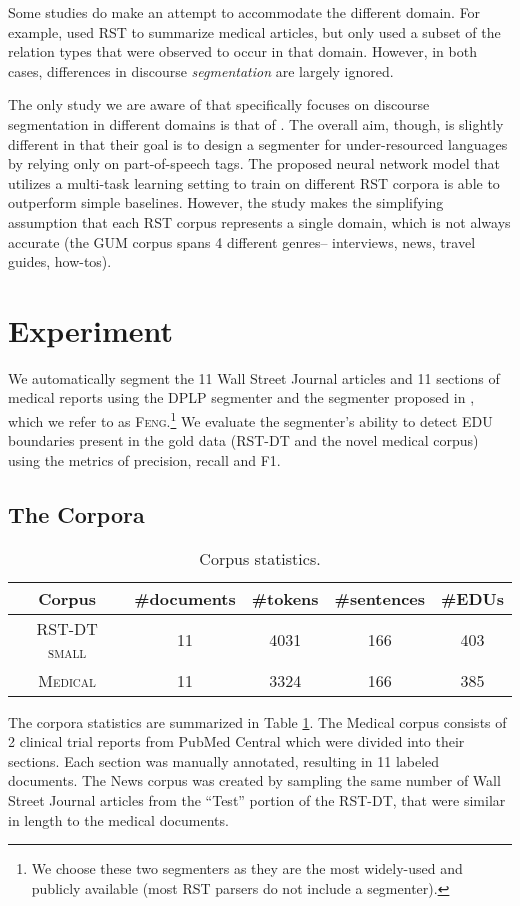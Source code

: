 Some studies do make an attempt to accommodate the different domain. For example,  used RST to summarize medical articles, but only used a subset of the relation types that were observed to occur in that domain. However, in both cases, differences in discourse \emph{segmentation} are largely ignored.

The only study we are aware of that specifically focuses on discourse segmentation in different domains is that of . The overall aim, though, is slightly different in that their goal is to design a segmenter for under-resourced languages by relying only on part-of-speech tags. The proposed neural network model that utilizes a multi-task learning setting to train on different RST corpora is able to outperform simple baselines. However, the study makes the simplifying assumption that each RST corpus represents a single domain, which is not always accurate (the GUM corpus\cite{Zeldes:2017} spans 4 different genres-- interviews, news, travel guides, how-tos).   

\section{Experiment}
We automatically segment the 11 Wall Street Journal articles and 11 sections of medical reports using the \textsc{DPLP} segmenter \cite{Ji:2014} and the segmenter proposed in , which we refer to as \textsc{Feng}.\footnote{We choose these two segmenters as they are the most widely-used and publicly available (most RST parsers do not include a segmenter).} We evaluate the segmenter's ability to detect EDU boundaries present in the gold data (RST-DT and the novel medical corpus) using the metrics of precision, recall and F1.

\subsection{The Corpora}
\begin{table}[t]
\centering
\begin{tabular}{ccccc}
\toprule
Corpus & \#documents  & \#tokens     & \#sentences     & \#EDUs    \\ \hline \hline
\textsc{RST-DT small} &11  &4031  &166  &403  \\
                                   \textsc{Medical} & 11 &3324  &166  &385\\             \bottomrule
\end{tabular}
\caption{Corpus statistics.}
\label{tab:cross_domain_corpus}
\end{table}
The corpora statistics are summarized in Table \ref{tab:cross_domain_corpus}. The Medical corpus consists of 2 clinical trial reports from PubMed Central which were divided into their sections. Each section was manually annotated, resulting in 11 labeled documents. The News corpus was created by sampling the same number of Wall Street Journal articles from the ``Test'' portion of the RST-DT, that were similar in length to the medical documents. 

